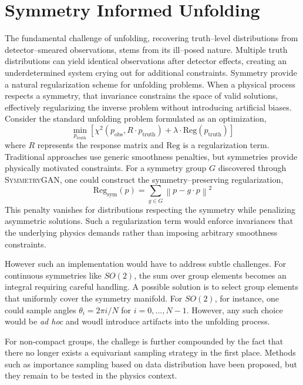 \section{Symmetry Informed Unfolding}
\label{sec:symmetry-informed-unfolding}
    The fundamental challenge of unfolding, recovering truth--level distributions from detector--smeared observations, stems from its ill--posed nature.
    Multiple truth distributions can yield identical observations after detector effects, creating an underdetermined system crying out for additional constraints.
    Symmetry provide a natural regularization scheme for unfolding problems.
    When a physical process respects a symmetry, that invariance constrains the space of valid solutions, effectively regularizing the inverse problem without introducing artificial biases.
    Consider the standard unfolding problem formulated as an optimization,
    \[
        \min_{p_\text{truth}} \left[ \chi^2(p_\text{obs}, R \cdot p_\text{truth}) + \lambda \cdot \text{Reg}(p_\text{truth}) \right]
    \]
    where \(R\) represents the response matrix and \(\text{Reg}\) is a regularization term.
    Traditional approaches use generic smoothness penalties, but symmetries provide physically motivated constraints.
    For a symmetry group \(G\) discovered through \textsc{SymmetryGAN}, one could construct the symmetry--preserving regularization,
    \[
        \text{Reg}_\text{sym}(p) = \sum_{g \in G} \left\| p - g \cdot p \right\|^2
    \]
    This penalty vanishes for distributions respecting the symmetry while penalizing asymmetric solutions.
    Such a regularization term would enforce invariances that the underlying physics demands rather than imposing arbitrary smoothness constraints.
    
    However such an implementation would have to address subtle challenges.
    For continuous symmetries like \(SO(2)\), the sum over group elements becomes an integral requiring careful handling.
    A possible solution is to select group elements that uniformly cover the symmetry manifold.
    For \(SO(2)\), for instance, one could sample angles \(\theta_i = 2\pi i/N\) for \(i = 0, ..., N-1\).
    However, any such choice would be \textit{ad hoc} and woudl introduce artifacts into the unfolding process.

    For non-compact groups, the challege is further compounded by the fact that there no longer exists a equivariant sampling strategy in the first place.
    Methods such as importance sampling based on data distribution have been proposed, but they remain to be tested in the physics context.
    
